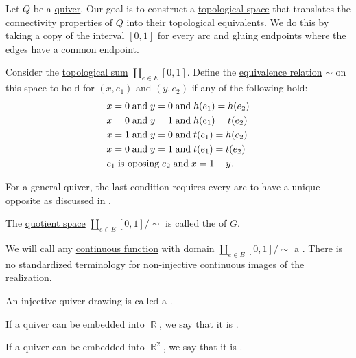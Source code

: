 \begin{definition}\label{def:quiver_geometric_realization}
  Let \( Q \) be a \hyperref[def:graph/quiver]{quiver}. Our goal is to construct a \hyperref[def:topological_space]{topological space} that translates the connectivity properties of \( Q \) into their topological equivalents. We do this by taking a copy of the interval \( [0, 1] \) for every arc and gluing endpoints where the edges have a common endpoint.

  Consider the \hyperref[def:topological_sum]{topological sum} \( \coprod_{e \in E} [0, 1] \). Define the \hyperref[def:equivalence_relation]{equivalence relation} \( {\sim} \) on this space to hold for \( (x, e_1) \) and \( (y, e_2) \) if any of the following hold:
  \begin{align*}
    &x = 0 \T{and} y = 0 \T{and} h(e_1) = h(e_2) \\
    &x = 0 \T{and} y = 1 \T{and} h(e_1) = t(e_2) \\
    &x = 1 \T{and} y = 0 \T{and} t(e_1) = h(e_2) \\
    &x = 0 \T{and} y = 1 \T{and} t(e_1) = t(e_2) \\
    &e_1 \T{is oposing} e_2 \T{and} x = 1 - y.
  \end{align*}

  For a general quiver, the last condition requires every arc to have a unique opposite as discussed in .

  The \hyperref[def:topological_quotient]{quotient space} \( \coprod_{e \in E} [0, 1] / {\sim} \) is called the  of \( G \).

  \begin{thmenum}
     We will call any \hyperref[def:global_continuity]{continuous function} with domain \( \coprod_{e \in E} [0, 1] / {\sim} \) a . There is no standardized terminology for non-injective continuous images of the realization.

     An injective quiver drawing is called a .

     If a quiver can be embedded into \( \BbbR \), we say that it is .

     If a quiver can be embedded into \( \BbbR^2 \), we say that it is .
  \end{thmenum}
\end{definition}

